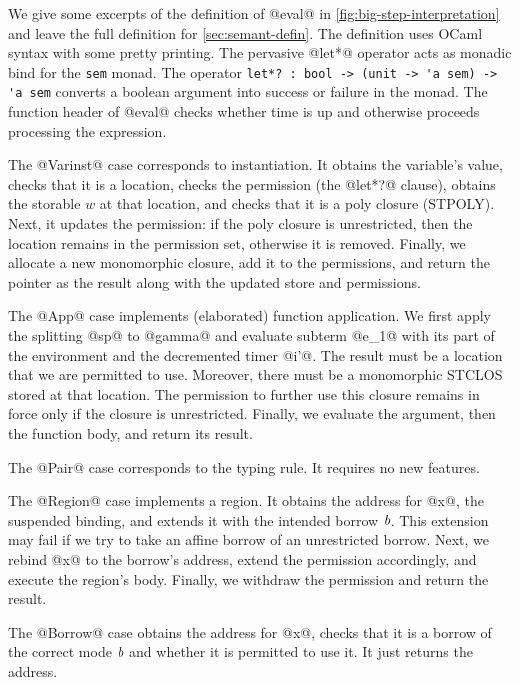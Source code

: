 

We give some excerpts of the definition of @eval@ in
\cref{fig:big-step-interpretation} and leave the full
definition for \cref{sec:semant-defin}.
The definition uses OCaml syntax with some pretty
printing. The pervasive @let*@ operator acts as monadic bind
for the \lstinline/sem/ monad. The operator
\lstinline/let*? : bool -> (unit -> 'a sem) -> 'a sem/
 converts a boolean
argument into success or failure in the monad.
 The function header of @eval@ checks
whether time is up and otherwise proceeds processing the expression.

The @Varinst@ case corresponds to instantiation. It
obtains the variable's value, checks that it is a location, checks the
permission (the @let*?@ clause), obtains the storable $w$ at that
location, and checks that it is a poly closure (STPOLY). Next, it updates the
permission: if the poly closure is unrestricted, then the location
remains in the permission set, otherwise it is removed. Finally, we
allocate a new monomorphic closure, add it to the permissions, and
return the pointer as the result along with the updated store and
permissions.

The @App@ case implements (elaborated) function application.
We first apply the splitting @sp@ to @gamma@ and
evaluate subterm @e_1@ with its part of the environment and the
decremented timer @i'@. The result must be a location that we are
permitted to use. Moreover, there must be a monomorphic STCLOS stored
at that location. The permission to further use this closure  remains
in force only if the closure is unrestricted. Finally, we evaluate the
argument, then the function body, and return its result.

The @Pair@ case corresponds to the  typing rule. It
requires no new features.


The @Region@ case implements a region. It obtains the address for @x@,
the suspended binding, and extends it with the intended borrow
$\textit{b}$. This extension may fail if we try to take an affine borrow
of an unrestricted borrow. Next, we rebind @x@ to the borrow's
address, extend the permission accordingly, and execute the region's
body.  Finally, we withdraw the permission and return the result.

The @Borrow@ case obtains the address for @x@, checks that it is a
borrow of the correct mode $\textit{b}$ and whether it is permitted to
use it. It just returns the address.

\lstDeleteShortInline@

